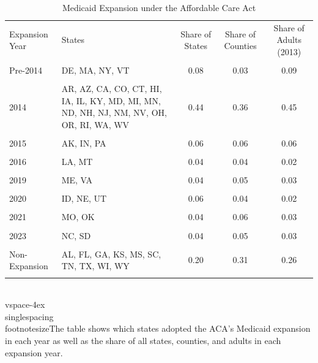 \begin{table}[!h]
\centering
\caption{\label{tab:aca_adopt}Medicaid Expansion under the Affordable Care Act}
\fontsize{12}{14}\selectfont
\begin{threeparttable}
\begin{tabular}[t]{lp{8cm}ccc}
\toprule
Expansion Year & States & Share of States & Share of Counties & Share of Adults (2013)\\\\ 
\midrule
Pre-2014 & DE, MA, NY, VT & 0.08 & 0.03 & 0.09\\\\ 
2014 & AR, AZ, CA, CO, CT, HI, IA, IL, KY, MD, MI, MN, ND, NH, NJ, NM, NV, OH, OR, RI, WA, WV & 0.44 & 0.36 & 0.45\\\\ 
2015 & AK, IN, PA & 0.06 & 0.06 & 0.06\\\\ 
2016 & LA, MT & 0.04 & 0.04 & 0.02\\\\ 
2019 & ME, VA & 0.04 & 0.05 & 0.03\\\\ 
2020 & ID, NE, UT & 0.06 & 0.04 & 0.02\\\\ 
2021 & MO, OK & 0.04 & 0.06 & 0.03\\\\ 
2023 & NC, SD & 0.04 & 0.05 & 0.03\\\\ 
Non-Expansion & AL, FL, GA, KS, MS, SC, TN, TX, WI, WY & 0.20 & 0.31 & 0.26\\\\ 
\bottomrule
\end{tabular}
\begin{tablenotes}[para]
\item \\vspace{-4ex} \\singlespacing \\footnotesize{The table shows which states adopted the ACA's Medicaid expansion in each year as well as the share of all states, counties, and adults in each expansion year.}
\end{tablenotes}
\end{threeparttable}
\end{table}

